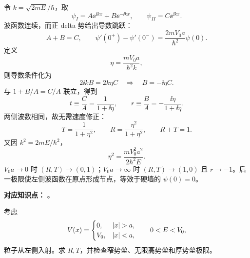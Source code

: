 \begin{checkedsolution}
令 $k=\sqrt{2mE}/\hbar$，取
\begin{equation}
  \psi_I=A\ee^{\ii kx}+B\ee^{-\ii kx},
  \qquad
  \psi_{II}=C\ee^{\ii kx}.
  \label{eq:QM-C05-S04-E02A-wavefunctions}
\end{equation}
波函数连续，而正 delta 势给出导数跳跃：
\begin{equation}
  A+B=C,
  \qquad
  \psi'(0^+)-\psi'(0^-)
  =\frac{2mV_0a}{\hbar^2}\psi(0).
  \label{eq:QM-C05-S04-E02A-boundary}
\end{equation}
定义
\begin{equation}
  \eta=\frac{mV_0a}{\hbar^2k},
  \label{eq:QM-C05-S04-E02A-eta}
\end{equation}
则导数条件化为
\begin{equation}
  2\ii kB=2k\eta C
  \quad\Longrightarrow\quad
  B=-\ii\eta C.
\end{equation}
与 $1+B/A=C/A$ 联立，得到
\begin{equation}
  \boxed{t\equiv\frac CA=\frac{1}{1+\ii\eta}},
  \qquad
  \boxed{r\equiv\frac BA=-\frac{\ii\eta}{1+\ii\eta}}.
  \label{eq:QM-C05-S04-E02A-amplitudes}
\end{equation}
两侧波数相同，故无需速度修正：
\begin{equation}
  \boxed{T=\frac{1}{1+\eta^2}},
  \qquad
  \boxed{R=\frac{\eta^2}{1+\eta^2}},
  \qquad
  R+T=1.
  \label{eq:QM-C05-S04-E02A-RT}
\end{equation}
又因 $k^2=2mE/\hbar^2$，
\begin{equation}
  \eta^2=\frac{mV_0^2a^2}{2\hbar^2E}.
\end{equation}
$V_0a\to0$ 时 $(R,T)\to(0,1)$；$V_0a\to\infty$ 时 $(R,T)\to(1,0)$ 且 $r\to-1$。后一极限使左侧波函数在原点形成节点，等效于硬墙的 $\psi(0)=0$。
\end{checkedsolution}

\nopagebreak[4]

\textbf{对应知识点：}
。
\nopagebreak[4]

考虑
\begin{equation}
  V(x)=
  \begin{cases}
    0,&\abs x>a,\\
    V_0,&\abs x<a,
  \end{cases}
  \qquad 0<E<V_0,
  \label{eq:QM-C05-S04-E02B-potential}
\end{equation}
粒子从左侧入射。求 $R,T$，并检查窄势垒、无限高势垒和厚势垒极限。

